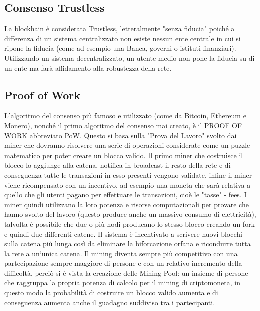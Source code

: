 \documentclass[11pt,a4paper,titlepage, twoside, openright]{report}
\begin{document}
\subsection{Consenso Trustless}
La blockhain è considerata Trustless, letteralmente "senza fiducia" poiché a differenza di un sistema centralizzato non esiste nessun ente centrale in cui si ripone la fiducia (come ad esempio una Banca, governi o istituti finanziari). Utilizzando un sistema decentralizzato, un utente medio non pone la fiducia su di un ente ma farà affidamento alla robustezza della rete. %

\subsection{Proof of Work}
L'algoritmo del consenso più famoso e utilizzato (come da Bitcoin, Ethereum e Monero), nonché il primo algoritmo del consenso mai creato, è il PROOF OF WORK abbreviato PoW. Questo si basa sulla "Prova del Lavoro" svolto dai miner che dovranno risolvere una serie di operazioni considerate come un puzzle matematico per poter creare un blocco valido. Il primo miner che costruisce il blocco lo aggiunge alla catena, notifica in broadcast il resto della rete e di conseguenza tutte le transazioni in esso presenti vengono validate, infine il miner viene ricompensato con un incentivo, ad esempio una moneta che sarà relativa a quello che gli utenti pagano per effettuare le transazioni, cioè le "tasse" - fees. I miner quindi utilizzano la loro potenza e risorse computazionali per provare che hanno svolto del lavoro (questo produce anche un massivo consumo di elettricità), talvolta è possibile che due o più nodi producano lo stesso blocco creando un fork e quindi due differenti catene. Il sistema è incentivato a scrivere nuovi blocchi sulla catena più lunga così da eliminare la biforcazione orfana e ricondurre tutta la rete a un`unica catena. Il mining diventa sempre più competitivo con una partecipazione sempre maggiore di persone e con un relativo incremento della difficoltà, perciò si è vista la creazione delle Mining Pool: un insieme di persone che raggruppa la propria potenza di calcolo per il mining di criptomoneta, in questo modo la probabilità di costruire un blocco valido aumenta e di conseguenza aumenta anche il guadagno suddiviso tra i partecipanti.
\end{document}
